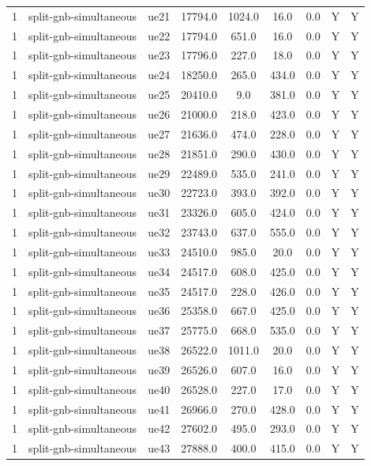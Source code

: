 \begin{table}[ht]
\begin{tabular}{|c|c|c|c|c|c|c|c|c|}
1 & split-gnb-simultaneous & ue21 & 17794.0 & 1024.0 & 16.0 & 0.0 & Y & Y \\
1 & split-gnb-simultaneous & ue22 & 17794.0 & 651.0 & 16.0 & 0.0 & Y & Y \\
1 & split-gnb-simultaneous & ue23 & 17796.0 & 227.0 & 18.0 & 0.0 & Y & Y \\
1 & split-gnb-simultaneous & ue24 & 18250.0 & 265.0 & 434.0 & 0.0 & Y & Y \\
1 & split-gnb-simultaneous & ue25 & 20410.0 & 9.0 & 381.0 & 0.0 & Y & Y \\
1 & split-gnb-simultaneous & ue26 & 21000.0 & 218.0 & 423.0 & 0.0 & Y & Y \\
1 & split-gnb-simultaneous & ue27 & 21636.0 & 474.0 & 228.0 & 0.0 & Y & Y \\
1 & split-gnb-simultaneous & ue28 & 21851.0 & 290.0 & 430.0 & 0.0 & Y & Y \\
1 & split-gnb-simultaneous & ue29 & 22489.0 & 535.0 & 241.0 & 0.0 & Y & Y \\
1 & split-gnb-simultaneous & ue30 & 22723.0 & 393.0 & 392.0 & 0.0 & Y & Y \\
1 & split-gnb-simultaneous & ue31 & 23326.0 & 605.0 & 424.0 & 0.0 & Y & Y \\
1 & split-gnb-simultaneous & ue32 & 23743.0 & 637.0 & 555.0 & 0.0 & Y & Y \\
1 & split-gnb-simultaneous & ue33 & 24510.0 & 985.0 & 20.0 & 0.0 & Y & Y \\
1 & split-gnb-simultaneous & ue34 & 24517.0 & 608.0 & 425.0 & 0.0 & Y & Y \\
1 & split-gnb-simultaneous & ue35 & 24517.0 & 228.0 & 426.0 & 0.0 & Y & Y \\
1 & split-gnb-simultaneous & ue36 & 25358.0 & 667.0 & 425.0 & 0.0 & Y & Y \\
1 & split-gnb-simultaneous & ue37 & 25775.0 & 668.0 & 535.0 & 0.0 & Y & Y \\
1 & split-gnb-simultaneous & ue38 & 26522.0 & 1011.0 & 20.0 & 0.0 & Y & Y \\
1 & split-gnb-simultaneous & ue39 & 26526.0 & 607.0 & 16.0 & 0.0 & Y & Y \\
1 & split-gnb-simultaneous & ue40 & 26528.0 & 227.0 & 17.0 & 0.0 & Y & Y \\
1 & split-gnb-simultaneous & ue41 & 26966.0 & 270.0 & 428.0 & 0.0 & Y & Y \\
1 & split-gnb-simultaneous & ue42 & 27602.0 & 495.0 & 293.0 & 0.0 & Y & Y \\
1 & split-gnb-simultaneous & ue43 & 27888.0 & 400.0 & 415.0 & 0.0 & Y & Y \\

\end{tabular}
\end{table}
